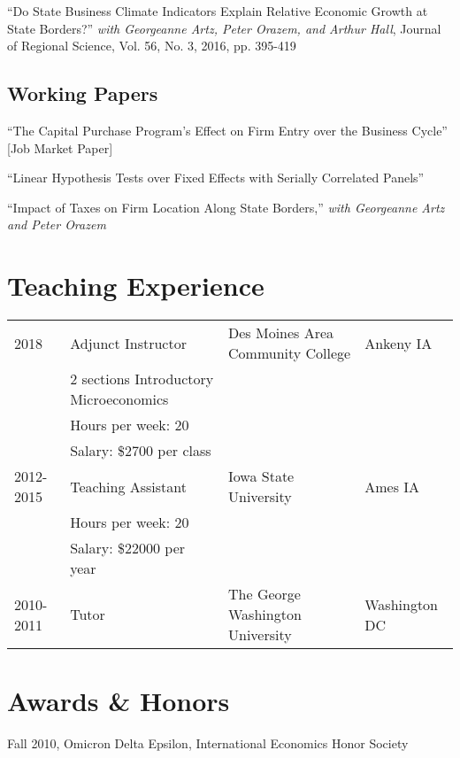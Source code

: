\documentclass[letterpaper]{article}
\renewenvironment{itemize}{
  \begin{list}{}{
    \setlength{\leftmargin}{0em}
  }
}{
  \end{list}
}
\begin{document}
\begin{itemize}
\item ``Do State Business Climate Indicators Explain Relative Economic Growth at State Borders?'' \textit{with Georgeanne Artz, Peter Orazem, and Arthur Hall}, Journal of Regional Science, Vol. 56, No. 3, 2016, pp. 395-419
\end{itemize}

\subsection*{Working Papers}

\begin{itemize}
\item ``The Capital Purchase Program's Effect on Firm Entry over the Business Cycle'' [Job Market Paper]
\item ``Linear Hypothesis Tests over Fixed Effects with Serially Correlated Panels''
\item ``Impact of Taxes on Firm Location Along State Borders,'' \textit{with Georgeanne Artz and Peter Orazem}
\end{itemize}

\section*{Teaching Experience}


\begin{tabular}{@{}llll}
2018 & Adjunct Instructor & Des Moines Area Community College & Ankeny IA \\
& 2 sections Introductory Microeconomics \\
& Hours per week: 20 \\
& Salary: \$2700 per class \\
2012-2015 & Teaching Assistant & Iowa State University & Ames IA \\
&Hours per week: 20 \\
&Salary: \$22000 per year \\
2010-2011 & Tutor & The George Washington University & Washington DC
\end{tabular}


\section*{Awards \& Honors}

\begin{itemize}
  \item Fall 2010, Omicron Delta Epsilon, International Economics Honor Society
\end{itemize}
\end{document}
